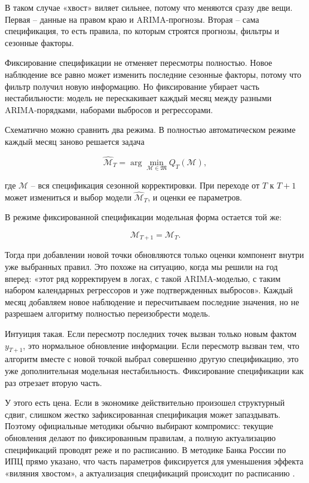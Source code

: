 \documentclass[12pt,fleqn]{article}
\begin{document}
В таком случае «хвост» виляет сильнее, потому что меняются сразу две вещи.
Первая -- данные на правом краю и ARIMA-прогнозы.
Вторая -- сама спецификация, то есть правила, по которым строятся прогнозы, фильтры и сезонные факторы.

Фиксирование спецификации не отменяет пересмотры полностью.
Новое наблюдение все равно может изменить последние сезонные факторы, потому что фильтр получил новую информацию.
Но фиксирование убирает часть нестабильности: модель не перескакивает каждый месяц между разными ARIMA-порядками, наборами выбросов и регрессорами.

Схематично можно сравнить два режима.
В полностью автоматическом режиме каждый месяц заново решается задача

\[
\hat{\mathcal{M}}_T
=
\arg\min_{\mathcal{M}\in\mathfrak{M}}
Q_T(\mathcal{M}),
\]

где \(\mathcal{M}\) -- вся спецификация сезонной корректировки.
При переходе от \(T\) к \(T+1\) может измениться и выбор модели \(\hat{\mathcal{M}}_T\), и оценки ее параметров.

В режиме фиксированной спецификации модельная форма остается той же:

\[
\mathcal{M}_{T+1}
=
\mathcal{M}_{T}.
\]

Тогда при добавлении новой точки обновляются только оценки компонент внутри уже выбранных правил.
Это похоже на ситуацию, когда мы решили на год вперед: «этот ряд корректируем в логах, с такой ARIMA-моделью, с таким набором календарных регрессоров и уже подтвержденных выбросов».
Каждый месяц добавляем новое наблюдение и пересчитываем последние значения, но не разрешаем алгоритму полностью переизобрести модель.

Интуиция такая.
Если пересмотр последних точек вызван только новым фактом \(y_{T+1}\), это нормальное обновление информации.
Если пересмотр вызван тем, что алгоритм вместе с новой точкой выбрал совершенно другую спецификацию, это уже дополнительная модельная нестабильность.
Фиксирование спецификации как раз отрезает вторую часть.

У этого есть цена.
Если в экономике действительно произошел структурный сдвиг, слишком жестко зафиксированная спецификация может запаздывать.
Поэтому официальные методики обычно выбирают компромисс: текущие обновления делают по фиксированным правилам, а полную актуализацию спецификаций проводят реже и по расписанию.
В методике Банка России по ИПЦ прямо указано, что часть параметров фиксируется для уменьшения эффекта «виляния хвостом», а актуализация спецификаций происходит по расписанию \cite{cbrcpi2020}.
\end{document}
